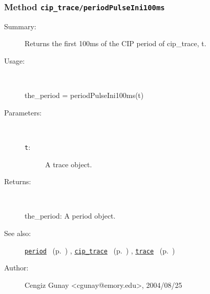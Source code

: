 \subsubsection[Method \texttt{periodPulseIni100ms}]{Method \texttt{cip\_trace/periodPulseIni100ms}}%
%
\label{ref_cip_trace__periodPulseIni100ms}%
\hypertarget{ref_cip_trace__periodPulseIni100ms}{}%
\begin{description}
\item[Summary:]Returns the first 100ms of the CIP period of 
			cip\_trace, t. 
%
\item[Usage:]~%
\begin{lyxcode}%
the\_period = periodPulseIni100ms(t)
%
\end{lyxcode}%
%
%
\item[Parameters:]~
\begin{description}%
\item[\texttt{t}:]
 A trace object.
\end{description}%
%
\item[Returns:
]~

	the\_period: A period object.
%
%
\item[See also:]%
\hyperlink{ref_period}{\texttt{period}}%
\ (p.~\pageref{ref_period})%
%
, \hyperlink{ref_cip_trace}{\texttt{cip\_trace}}%
\ (p.~\pageref{ref_cip_trace})%
%
, \hyperlink{ref_trace}{\texttt{trace}}%
\ (p.~\pageref{ref_trace})%
%
%
\item[Author:]%
Cengiz Gunay <cgunay@emory.edu>, 2004/08/25
%
\end{description}
\methodline%
